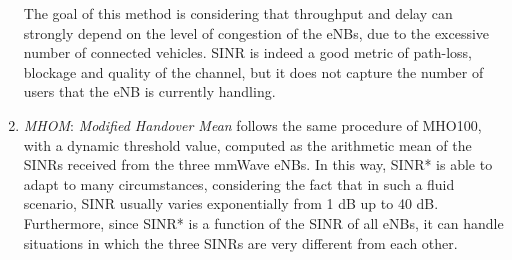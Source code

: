 \documentclass[conference,10pt]{IEEEtran}
\begin{document}
\begin{enumerate}
The goal of this method is considering that throughput and delay can strongly depend on the level of congestion of the eNBs, due to the excessive number of connected vehicles. SINR is indeed a good metric of path-loss, blockage and quality of the channel, but it does not capture the number of users that the eNB is currently handling.

\item \emph{MHOM}:
\emph{Modified Handover Mean} follows the same procedure of MHO100, with a dynamic threshold value, computed as the arithmetic mean of the SINRs received from the three mmWave eNBs. In this way, SINR* is able to adapt to many circumstances, considering the fact that in such a fluid scenario, SINR usually varies exponentially from 1 dB up to 40 dB. Furthermore, since SINR* is a function of the SINR of all eNBs, it can handle situations in which the three SINRs are very different from each other.


\end{enumerate}
\end{document}
